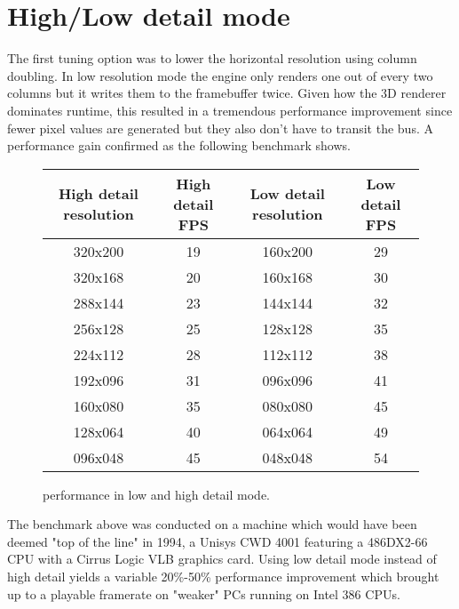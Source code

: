 \section{High/Low detail mode}
The first tuning option was to lower the horizontal resolution using column doubling. In low resolution mode the engine only renders one out of every two columns but it writes them to the framebuffer twice. Given how the 3D renderer dominates runtime, this resulted in a tremendous performance improvement since fewer pixel values are generated but they also don't have to transit the bus.  A performance gain confirmed as the following benchmark shows.\\
\par
 \vspace{0.5cm}
\begin{figure}[H]
\centering  
\begin{tabularx}{\textwidth}{ C{1} C{1} C{1} C{1} } 
  \toprule
  \textbf{High detail resolution} & \textbf{High detail FPS} &  \textbf{Low detail resolution}  & \textbf{Low detail FPS}\\
  \toprule 
320x200  &  19   & 160x200  &       29 \\
320x168  &  20   & 160x168  &       30 \\
288x144  &  23   & 144x144  &       32 \\
256x128  &  25   & 128x128  &       35 \\
224x112  &  28   & 112x112  &       38 \\
192x096  &  31   & 096x096  &       41 \\
160x080  &  35   & 080x080  &       45 \\
128x064  &  40   & 064x064  &       49 \\
096x048  &  45   & 048x048  &       54 \\
  \toprule
\end{tabularx}
\caption{\doom{} performance in low and high detail mode.}
\end{figure}
The benchmark above was conducted on a machine which would have been deemed "top of the line" in 1994, a Unisys CWD 4001 featuring a 486DX2-66 CPU with a Cirrus Logic VLB graphics card. Using low detail mode instead of high detail yields a variable 20\%-50\% performance improvement which brought \doom{} up to a playable framerate on "weaker" PCs running on Intel 386 CPUs.


